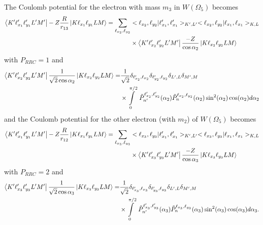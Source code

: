The Coulomb potential for the electron with mass $m_3$ in $W(\Omega_5)$ becomes
\begin{align}
    \bra{K'\ell_{x_1}'\ell_{y_1}'L'M'} -Z\frac{R}{r_{13}} \ket{K \ell_{x_1} \ell_{y_1}LM} = \sum_{\ell_{x_2},\ell_{y_2}}& <\ell_{x_2},\ell_{y_2}|\ell_{x_1}',\ell_{x_1}'>_{K',L'} <\ell_{x_2},\ell_{y_2}|\ell_{x_1},\ell_{x_1}>_{K,L} \\
    &\times \bra{K'\ell_{x_2}'\ell_{y_2}'L'M'} \frac{-Z}{\cos\alpha_2} \ket{K\ell_{x_2}\ell_{y_2}LM}
\end{align}
with $P_{RRC}=1$  and 
\begin{align}
    \bra{K'\ell_{x_2}'\ell_{y_2}'L'M'} \frac{1}{\sqrt{2}\cos\alpha_2} \ket{K \ell_{x_2} \ell_{y_2}LM} =& \frac{1}{\sqrt{2}} \delta_{\ell_{x_2}',\ell_{x_2}} \delta_{\ell_{y_2}',\ell_{y_2}} \delta_{L',L} \delta_{M',M} \\
    & \times \int\limits_0^{\pi/2}\ \tilde{P}^{\ell_{x_2}',\ell_{y_2}'}_{n'}(\alpha_2) \tilde{P}^{\ell_{x_2},\ell_{y_2}}_{n}(\alpha_2) \sin^2(\alpha_2) \cos(\alpha_2)d\alpha_2  
\end{align}
and the Coulomb potential for the other electron (with $m_2$) of $W(\Omega_5)$ becomes
\begin{align}
    \bra{K'\ell_{x_1}'\ell_{y_1}'L'M'} -Z\frac{R}{r_{12}} \ket{K \ell_{x_1} \ell_{y_1}LM} = \sum_{\ell_{x_3},\ell_{y_3}}& <\ell_{x_3},\ell_{y_3}|\ell_{x_1}',\ell_{x_1}'>_{K',L'} <\ell_{x_3},\ell_{y_3}|\ell_{x_1},\ell_{x_1}>_{K,L} \\
    &\times \bra{K'\ell_{x_3}'\ell_{y_3}'L'M'} \frac{-Z}{\cos\alpha_3} \ket{K\ell_{x_3}\ell_{y_3}LM}
\end{align}
with $P_{RRC}=2$  and 
\begin{align}
    \bra{K'\ell_{x_3}'\ell_{y_3}'L'M'} \frac{1}{\sqrt{2}\cos\alpha_3} \ket{K \ell_{x_3} \ell_{y_3}LM} =& \frac{1}{\sqrt{2}} \delta_{\ell_{x_3}',\ell_{x_3}} \delta_{\ell_{y_3}',\ell_{y_3}} \delta_{L',L} \delta_{M',M} \\
    & \times \int\limits_0^{\pi/2}\ \tilde{P}^{\ell_{x_3}',\ell_{y_3}'}_{n'}(\alpha_3) \tilde{P}^{\ell_{x_3},\ell_{y_3}}_{n}(\alpha_3) \sin^2(\alpha_3) \cos(\alpha_3)d\alpha_3.  
\end{align}

